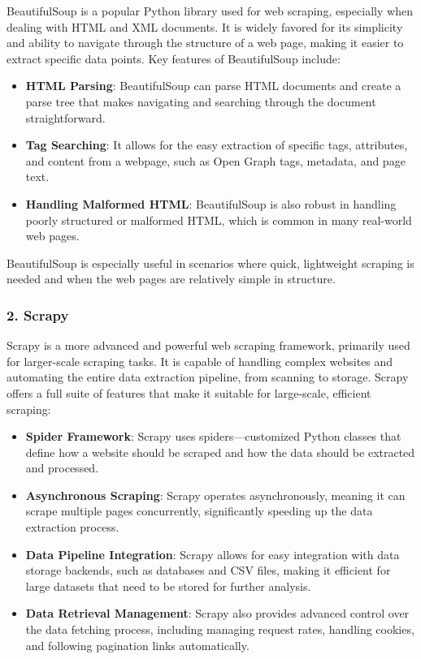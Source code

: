 BeautifulSoup is a popular Python library used for web scraping, especially when dealing with HTML and XML documents. It is widely favored for its simplicity and ability to navigate through the structure of a web page, making it easier to extract specific data points. Key features of BeautifulSoup include:

\begin{itemize}
    \item \textbf{HTML Parsing}: BeautifulSoup can parse HTML documents and create a parse tree that makes navigating and searching through the document straightforward.
    \item \textbf{Tag Searching}: It allows for the easy extraction of specific tags, attributes, and content from a webpage, such as Open Graph tags, metadata, and page text.
    \item \textbf{Handling Malformed HTML}: BeautifulSoup is also robust in handling poorly structured or malformed HTML, which is common in many real-world web pages.
\end{itemize}

BeautifulSoup is especially useful in scenarios where quick, lightweight scraping is needed and when the web pages are relatively simple in structure.

\subsubsection{2. Scrapy}

Scrapy is a more advanced and powerful web scraping framework, primarily used for larger-scale scraping tasks. It is capable of handling complex websites and automating the entire data extraction pipeline, from scanning to storage. Scrapy offers a full suite of features that make it suitable for large-scale, efficient scraping:

\begin{itemize}
    \item \textbf{Spider Framework}: Scrapy uses spiders—customized Python classes that define how a website should be scraped and how the data should be extracted and processed.
    \item \textbf{Asynchronous Scraping}: Scrapy operates asynchronously, meaning it can scrape multiple pages concurrently, significantly speeding up the data extraction process.
    \item \textbf{Data Pipeline Integration}: Scrapy allows for easy integration with data storage backends, such as databases and CSV files, making it efficient for large datasets that need to be stored for further analysis.
    \item \textbf{Data Retrieval Management}: Scrapy also provides advanced control over the data fetching process, including managing request rates, handling cookies, and following pagination links automatically.
\end{itemize}


